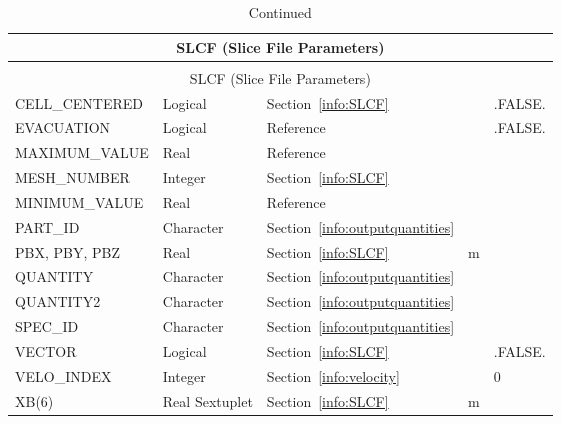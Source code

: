 \documentclass[11pt]{book}
\begin{document}
\begin{longtable}{@{\extracolsep{\fill}}|l|l|l|l|l|}
\caption[Slice file parameters ({\ct SLCF} namelist group)]{For more information see Section~\ref{info:SLCF}.}
\label{tbl:SLCF} \\
\hline
\multicolumn{5}{|c|}{{\ct SLCF} (Slice File Parameters)} \\
\hline \hline
\endfirsthead
\caption[]{Continued} \\
\hline
\multicolumn{5}{|c|}{{\ct SLCF} (Slice File Parameters)} \\
\hline \hline
\endhead
{\ct CELL\_CENTERED}    & Logical           & Section~\ref{info:SLCF}                   &           & {\ct .FALSE.}     \\ \hline
{\ct EVACUATION}        & Logical           & Reference~\cite{FDS_Evac_Users_Guide}     &           & {\ct .FALSE.}\\ \hline
{\ct MAXIMUM\_VALUE}    & Real              & Reference~\cite{Smokeview_Users_Guide}    &           &                   \\ \hline
{\ct MESH\_NUMBER}      & Integer           & Section~\ref{info:SLCF}                   &           &                   \\ \hline
{\ct MINIMUM\_VALUE}    & Real              & Reference~\cite{Smokeview_Users_Guide}    &           &                   \\ \hline
{\ct PART\_ID}          & Character         & Section~\ref{info:outputquantities}       &           &                   \\ \hline
{\ct PBX, PBY, PBZ}     & Real              & Section~\ref{info:SLCF}                   & m         &                   \\ \hline
{\ct QUANTITY}          & Character         & Section~\ref{info:outputquantities}       &           &                   \\ \hline
{\ct QUANTITY2}         & Character         & Section~\ref{info:outputquantities}       &           &                   \\ \hline
{\ct SPEC\_ID}          & Character         & Section~\ref{info:outputquantities}       &           &                   \\ \hline
{\ct VECTOR    }        & Logical           & Section~\ref{info:SLCF}                   &           & {\ct .FALSE.}     \\ \hline
{\ct VELO\_INDEX}       & Integer           & Section~\ref{info:velocity}               &           &  0                \\ \hline
{\ct XB(6)}             & Real Sextuplet    & Section~\ref{info:SLCF}                   & m         &                   \\ \hline
\end{longtable}
\end{document}
